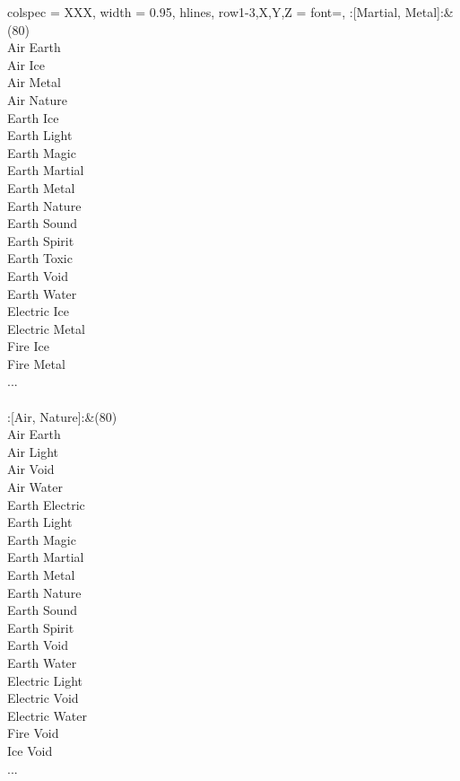 \begin{longtblr}[
	caption = {2v2 Attacking Effective},
	label = {2v2-Attacking-Effective},
]{
	colspec = {XXX}, width = 0.95\linewidth,
	hlines,
	row{1-3,X,Y,Z} = {font=\bfseries},
}
	:[Martial, Metal]:&{(80)\\
	Air Earth \\
	Air Ice \\
	Air Metal \\
	Air Nature \\
	Earth Ice \\
	Earth Light \\
	Earth Magic \\
	Earth Martial \\
	Earth Metal \\
	Earth Nature \\
	Earth Sound \\
	Earth Spirit \\
	Earth Toxic \\
	Earth Void \\
	Earth Water \\
	Electric Ice \\
	Electric Metal \\
	Fire Ice \\
	Fire Metal \\
	...\\
	}\\

	:[Air, Nature]:&{(80)\\
	Air Earth \\
	Air Light \\
	Air Void \\
	Air Water \\
	Earth Electric \\
	Earth Light \\
	Earth Magic \\
	Earth Martial \\
	Earth Metal \\
	Earth Nature \\
	Earth Sound \\
	Earth Spirit \\
	Earth Void \\
	Earth Water \\
	Electric Light \\
	Electric Void \\
	Electric Water \\
	Fire Void \\
	Ice Void \\
	...\\
	}\\


\end{longtblr}
